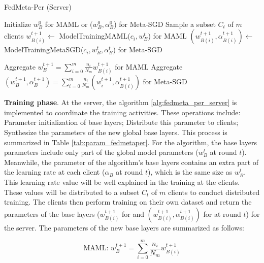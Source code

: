 \documentclass[runningheads]{llncs}
\begin{document}
\begin{algorithm}[h]
    \caption{FedMeta-Per (Server)} \label{alg:fedmeta_per_server}
    \begin{algorithmic}[1]
        \State Initialize $w_B^0$ for MAML or ($w_B^0, \alpha_B^0$) for Meta-SGD
            \State Sample a subset $C_t$ of $m$ clients
                \State $w_{B(i)}^{t+1} \gets$ ModelTrainingMAML($c_i, w_B^t$) for MAML
                \State $(w_{B(i)}^{t+1}, \alpha_{B(i)}^{t+1}) \gets$ ModelTrainingMetaSGD($c_i, w_B^t, \alpha_B^t$) for Meta-SGD
            \EndFor

            \State
            \State Aggregate $w_{B}^{t+1} = \sum_{i=0}^m \frac{n_i}{N_m} w_{B(i)}^{t+1}$ for MAML
            \State Aggregate $(w_B^{t+1}, \alpha_B^{t+1}) = \sum_{i=0}^m \frac{n_i}{N_m} (w_i^{t+1}, \alpha_{B(i)}^{t+1})$ for Meta-SGD
        \EndFor
    \end{algorithmic}
\end{algorithm}

\textbf{Training phase}. At the server, the algorithm \ref{alg:fedmeta_per_server} is implemented to coordinate the training activities. These operations include: Parameter initialization of base layers; Distribute this parameter to clients; Synthesize the parameters of the new global base layers. This process is summarized in Table \ref{tab:param_fedmetaper}. For the  algorithm, the base layers parameters include only part of the global model parameters ($w_B^t$ at round $t$). Meanwhile, the parameter of the  algorithm's base layers contains an extra part of the learning rate at each client ($\alpha_B$ at round $t$), which is the same size as $w_B^t$. This learning rate value will be well explained in the training at the clients. These values will be distributed to a subset $C_t$ of $m$ clients to conduct distributed training. The clients then perform training on their own dataset and return the parameters of the base layers ($w_{B(i)}^{t+1}$ for  and $( w_{B(i)}^{t+1}, \alpha_{B(i)}^{t+1})$ for  at round $t$) for the server. The parameters of the new base layers are summarized as follows:

\begin{dmath}
    \text{MAML: } w_{B}^{t+1} = \sum_{i=0}^m \frac{n_i}{N_m} w_{B(i)}^{t+1}
\end{dmath}
\end{document}
